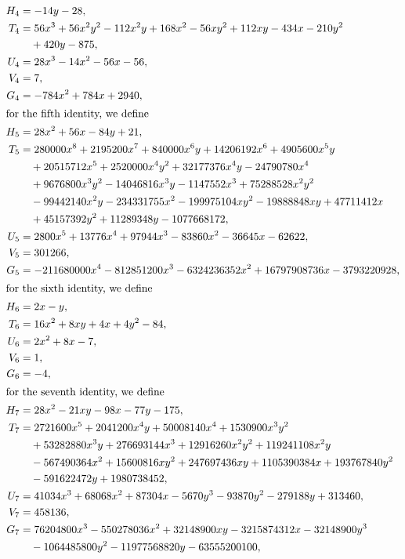 \documentclass[11pt]{article}
\begin{document}
\begin{align*}
H_{4}&=-14y-28,\\
T_{4}&=56x^{3}+56x^{2}y^{2}-112x^{2}y+168x^{2}-56xy^{2}+112xy-434x-210y^{2}\\
&\quad+420y-875,\\
U_{4}&=28x^{3}-14x^{2}-56x-56,\\
V_{4}&=7,\\
G_{4}&=-784x^{2}+784x+2940,\\
\intertext{for the fifth identity, we define}
H_{5}&=28x^{2}+56x-84y+21,\\
T_{5}&=280000x^{8}+2195200x^{7}+840000x^{6}y+14206192x^{6}+4905600x^{5}y\\
&\quad+20515712x^{5}+2520000x^{4}y^{2}+32177376x^{4}y-24790780x^{4}\\
&\quad+9676800x^{3}y^{2}-14046816x^{3}y-1147552x^{3}+75288528x^{2}y^{2}\\
&\quad-99442140x^{2}y-234331755x^{2}-199975104xy^{2}-19888848xy+47711412x\\
&\quad+45157392y^{2}+11289348y-1077668172,\\
U_{5}&=2800x^{5}+13776x^{4}+97944x^{3}-83860x^{2}-36645x-62622,\\
V_{5}&=301266,\\
G_{5}&=-211680000x^{4}-812851200x^{3}-6324236352x^{2}+16797908736x-3793220928,\\
\intertext{for the sixth identity, we define}
H_{6}&=2x-y,\\
T_{6}&=16x^{2}+8xy+4x+4y^{2}-84,\\
U_{6}&=2x^{2}+8x-7,\\
V_{6}&=1,\\
G_{6}&=-4,\\
\intertext{for the seventh identity, we define}
H_{7}&=28x^{2}-21xy-98x-77y-175,\\
T_{7}&=2721600x^{5}+2041200x^{4}y+50008140x^{4}+1530900x^{3}y^{2}\\
&\quad+53282880x^{3}y+276693144x^{3}+12916260x^{2}y^{2}+119241108x^{2}y\\
&\quad-567490364x^{2}+15600816xy^{2}+247697436xy+1105390384x+193767840y^{2}\\
&\quad-591622472y+1980738452,\\
U_{7}&=41034x^{3}+68068x^{2}+87304x-5670y^{3}-93870y^{2}-279188y+313460,\\
V_{7}&=458136,\\
G_{7}&=76204800x^{3}-550278036x^{2}+32148900xy-3215874312x-32148900y^{3}\\
&\quad-1064485800y^{2}-11977568820y-63555200100,\\

\end{align*}
\end{document}
